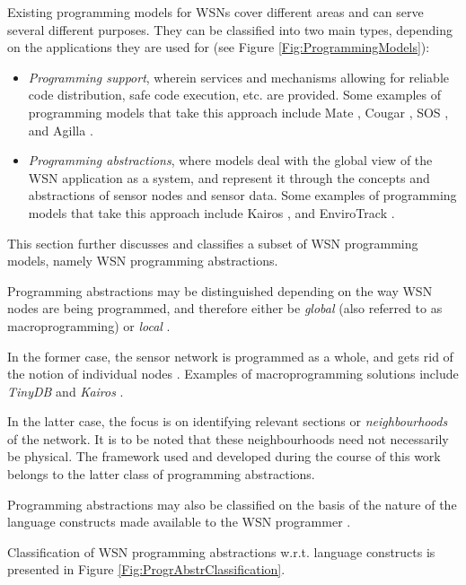 Existing programming models for WSNs cover different areas and can serve 
several different purposes. They can be classified into two main types, depending on 
the applications they are used for  \cite{hadim_middleware:2006} (see Figure
\ref{Fig:ProgrammingModels}):
\begin{itemize}
\item \emph{Programming support}, wherein services and mechanisms allowing for 
reliable code distribution, safe code execution, etc. are provided. Some
examples of programming models that take this approach include Mate
\cite{Levis_Mate:2002}, Cougar \cite{Bonnet_Cougar:2001}, SOS
\cite{Han_SOS:2005}, and Agilla \cite{Fok_Agilla:2005}.
\item \emph{Programming abstractions}, where models deal with the global view 
of the WSN application as a system, and represent it through the concepts and 
abstractions of sensor nodes and sensor data. Some
examples of programming models that take this approach include Kairos \cite{gummadi_Kairos:2005}, and
EnviroTrack \cite{Abdelzaher_EnviroTrack:2004}.
\end{itemize}

This section further discusses and classifies a subset of WSN programming
models, namely WSN programming abstractions.

Programming abstractions may be distinguished depending on the way WSN nodes
are being programmed, and therefore either be
\emph{global} (also referred to as macroprogramming) or \emph{local} \cite{hadim_middleware:2006}. 

In the former case, the sensor network is programmed as a whole, and gets rid of
the notion of individual nodes \cite{mottola_middleware:2008}. Examples of
macroprogramming solutions include \emph{TinyDB} \cite{madden_TinyDB:2005} and
\emph{Kairos} \cite{gummadi_Kairos:2005}. 

In the latter case, the focus is on identifying relevant sections or
\emph{neighbourhoods} of the network. It is to be noted that these neighbourhoods
need not necessarily be physical. The framework used and developed during the
course of this work belongs to the latter class of programming abstractions.

Programming abstractions may also be classified on the basis of the
nature of the language constructs made available to the WSN programmer
\cite{mottola_middleware:2008}. 

Classification of WSN programming abstractions w.r.t. language constructs is
presented in Figure \ref{Fig:ProgrAbstrClassification}.

